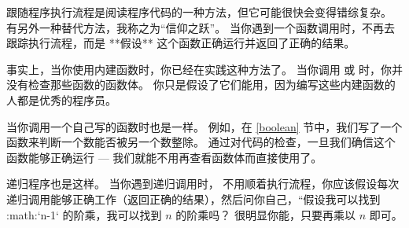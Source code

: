 
跟随程序执行流程是阅读程序代码的一种方法，但它可能很快会变得错综复杂。
有另外一种替代方法，我称之为``信仰之跃''。
当你遇到一个函数调用时，不再去跟踪执行流程，而是 **假设** 这个函数正确运行并返回了正确的结果。


事实上，当你使用内建函数时，你已经在实践这种方法了。
当你调用  或  时，你并没有检查那些函数的函数体。
你只是假设了它们能用，因为编写这些内建函数的人都是优秀的程序员。


当你调用一个自己写的函数时也是一样。
例如，在 \ref{boolean} 节中，我们写了一个  函数来判断一个数能否被另一个数整除。
通过对代码的检查，一旦我们确信这个函数能够正确运行 --- 我们就能不用再查看函数体而直接使用了。


递归程序也是这样。
当你遇到递归调用时， 不用顺着执行流程，你应该假设每次递归调用能够正确工作（返回正确的结果），然后问你自己，“假设我可以找到 :math:`n-1` 的阶乘，我可以找到 $n$ 的阶乘吗？
很明显你能，只要再乘以 $n$ 即可。


